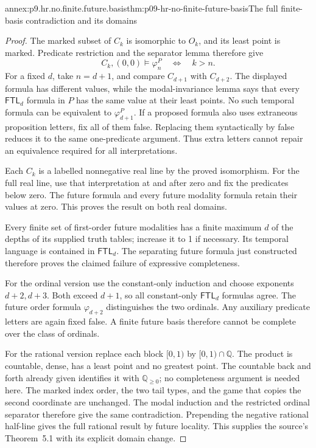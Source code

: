 \begin{annexitem}{annex:p9.hr.no.finite.future.basis}{thm:p09-hr-no-finite-future-basis}{The full finite-basis contradiction and its domains}
\begin{proof}
The marked subset
of \(C_k\) is
isomorphic to
\(O_k\), and its
least point is
marked. Predicate
restriction and
the separator
lemma therefore
give
\[
       C_k,(0,0)\models\varphi_n^P
                      \quad\Longleftrightarrow\quad k>n.
\]
For a fixed \(d\),
take \(n=d+1\),
and compare
\(C_{d+1}\) with
\(C_{d+2}\).
The displayed
formula has
different values,
while the
modal-invariance
lemma says that
every \(\mathsf{FTL}_d\)
formula in \(P\)
has the same
value at their
least points.
No such temporal
formula can be
equivalent to
\(\varphi_{d+1}^P\).
If a proposed
formula also uses
extraneous proposition
letters, fix all
of them false.
Replacing them
syntactically by
false reduces it
to the same
one-predicate
argument. Thus
extra letters
cannot repair
an equivalence
required for
all interpretations.

Each \(C_k\)
is a labelled
nonnegative real
line by the
proved isomorphism.
For the full
real line, use
that interpretation
at and after
zero and fix
the predicates
below zero.
The future
formula and
every future
modality formula
retain their
values at zero.
This proves
the result
on both real
domains.

Every finite
set of
first-order
future modalities
has a finite
maximum \(d\)
of the depths
of its supplied
truth tables;
increase it to
1 if necessary.
Its temporal
language is
contained in
\(\mathsf{FTL}_d\).
The separating
future formula
just constructed
therefore proves
the claimed
failure of
expressive
completeness.

For the ordinal
version use
the constant-only
induction and
choose exponents
\(d+2,d+3\).
Both exceed
\(d+1\), so
all constant-only
\(\mathsf{FTL}_d\)
formulas agree.
The future
order formula
\(\varphi_{d+2}\)
distinguishes
the two ordinals.
Any auxiliary
predicate letters
are again fixed
false. A finite
future basis
therefore cannot
be complete
over the class
of ordinals.

For the rational
version replace
each block
\([0,1)\) by
\([0,1)\cap\mathbb Q\).
The product
is countable,
dense, has a
least point
and no greatest
point. The
countable back
and forth
already given
identifies it
with \(\mathbb Q_{\geq0}\);
no completeness
argument is
needed here.
The marked
index order,
the two tail
types, and
the game that
copies the
second coordinate
are unchanged.
The modal
induction and
the restricted
ordinal separator
therefore give
the same
contradiction.
Prepending the
negative rational
half-line gives
the full
rational result
by future
locality. This
supplies the
source's
Theorem~5.1
with its
explicit
domain change.
\end{proof}
\end{annexitem}

